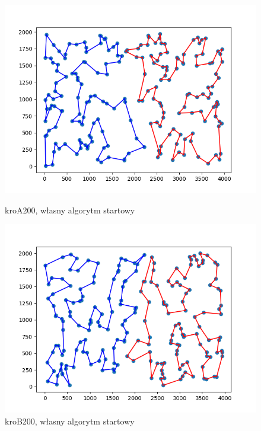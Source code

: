 \documentclass[11pt]{article}
\begin{document}
\begin{figure}[H]
    \vspace{0.5cm}

    \begin{minipage}[t]{0.45\textwidth}
        \centering
        \includegraphics[width=\linewidth]{best_paths/kroA200/traverse_steepest/split_paths_regret_TSP.png}
        \caption{kroA200, własny algorytm startowy}
    \end{minipage}
    \hfill
    \begin{minipage}[t]{0.45\textwidth}
        \centering
        \includegraphics[width=\linewidth]{best_paths/kroB200/traverse_steepest/split_paths_regret_TSP.png}
        \caption{kroB200, własny algorytm startowy}
    \end{minipage}
    \label{fig:minipage-steepest-edge}
\end{figure}
\end{document}
